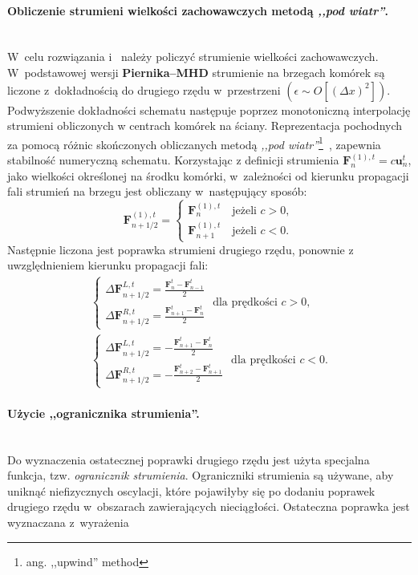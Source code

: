 \paragraph{Obliczenie strumieni wielkości zachowawczych metodą \emph{,,pod wiatr''}.}~\\
%
W~celu rozwiązania  i~ należy policzyć strumienie
wielkości zachowawczych. W~podstawowej wersji \textbf{Piernika--MHD} strumienie
na brzegach komórek są liczone z~dokładnością do drugiego rzędu w~przestrzeni
$\left(\epsilon \sim O\left[(\Delta x)^2\right]\right)$. 
Podwyższenie dokładności schematu następuje poprzez monotoniczną interpolację
strumieni obliczonych w centrach komórek na ściany. Reprezentacja pochodnych za
pomocą różnic skończonych obliczanych metodą \emph{,,pod wiatr''}\footnote{ang.
,,upwind'' method}~\cite{cir}, zapewnia stabilność numeryczną schematu.
Korzystając z definicji strumienia $\mathbf{F}_n^{(1),t}=c \mathbf{u}_n^t$, jako
wielkości określonej na środku komórki, w~zależności od kierunku propagacji fali
strumień na brzegu jest obliczany w~następujący sposób:
%
\begin{equation}
   \mathbf{F}^{(1),t}_{n+1/2} = 
   \begin{cases}
      \mathbf{F}^{(1),t}_{n}  \quad \textrm{jeżeli }c>0,\\
      \mathbf{F}^{(1),t}_{n+1}\quad \textrm{jeżeli }c<0.
   \end{cases}
\end{equation}
%
Następnie liczona jest poprawka strumieni drugiego rzędu, ponownie z
uwzględnieniem kierunku propagacji fali:
%
\begin{align} \label{lab1}
   \begin{cases} 
      \Delta \mathbf{F}^{L,t}_{n+1/2} = \frac{\mathbf{F}^t_{n} - \mathbf{F}^t_{n-1}}{2} \\
      \Delta \mathbf{F}^{R,t}_{n+1/2} = \frac{\mathbf{F}^t_{n+1} - \mathbf{F}^t_{n}}{2}
   \end{cases} \textrm{ dla prędkości }c>0,\\
   \label{lab2}\begin{cases} 
   \Delta \mathbf{F}^{L,t}_{n+1/2} = -\frac{\mathbf{F}^t_{n+1} - \mathbf{F}^t_{n}}{2} \\
   \Delta \mathbf{F}^{R,t}_{n+1/2} = -\frac{\mathbf{F}^t_{n+2} - \mathbf{F}^t_{n+1}}{2}
   \end{cases} \textrm{ dla prędkości }c<0.
\end{align}

\paragraph{Użycie ,,ogranicznika strumienia''.}~\\
Do wyznaczenia ostatecznej poprawki drugiego rzędu jest użyta specjalna funkcja,
tzw. \emph{ogranicznik strumienia}. Ograniczniki strumienia są używane, aby
uniknąć niefizycznych oscylacji, które pojawiłyby się po dodaniu poprawek
drugiego rzędu w~obszarach zawierających nieciągłości.  Ostateczna poprawka jest
wyznaczana z~wyrażenia

